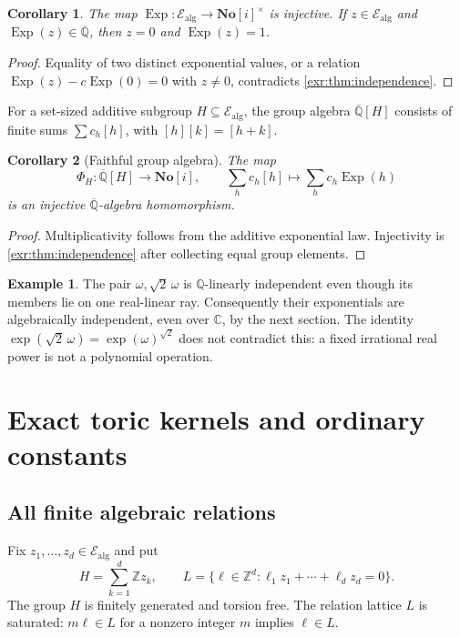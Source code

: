 \documentclass[11pt,letterpaper]{article}
\numberwithin{equation}{section}
\newtheorem{corollary}[corollary]{Corollary}
\theoremstyle{definition}
\newtheorem{example}[example]{Example}
\theoremstyle{remark}
\newcommand{\SC}{\mathbf{No}[i]}
\newcommand{\Z}{\mathbb Z}
\newcommand{\Q}{\mathbb Q}
\newcommand{\C}{\mathbb C}
\newcommand{\Qb}{\overline{\mathbb Q}}
\newcommand{\Ealg}{\mathcal E_{\mathrm{alg}}}
\newcommand{\Exp}{\operatorname{Exp}}
\begin{document}
\begin{corollary}\label{exr:cor:injective}
The map $\Exp:\Ealg\to\SC^\times$ is injective. If $z\in\Ealg$ and
$\Exp(z)\in\Qb$, then $z=0$ and $\Exp(z)=1$.
\end{corollary}
\begin{proof}
Equality of two distinct exponential values, or a relation
$\Exp(z)-c\Exp(0)=0$ with $z\ne0$, contradicts \cref{exr:thm:independence}.
\end{proof}

For a set-sized additive subgroup $H\subseteq\Ealg$, the group algebra $\Qb[H]$
consists of finite sums $\sum c_h[h]$, with $[h][k]=[h+k]$.
\begin{corollary}[Faithful group algebra]\label{exr:cor:groupalgebra}
The map
\begin{equation}
 \Phi_H:\Qb[H]\longrightarrow\SC,\qquad
 \sum_h c_h[h]\longmapsto\sum_h c_h\Exp(h)
\end{equation}
is an injective $\Qb$-algebra homomorphism.
\end{corollary}
\begin{proof}
Multiplicativity follows from the additive exponential law. Injectivity is
\cref{exr:thm:independence} after collecting equal group elements.
\end{proof}

\begin{example}
The pair $\omega,\sqrt2\,\omega$ is $\Q$-linearly independent even though its
members lie on one real-linear ray. Consequently their exponentials are
algebraically independent, even over $\C$, by the next section. The identity
$\exp(\sqrt2\,\omega)=\exp(\omega)^{\sqrt2}$ does not contradict this: a fixed
irrational real power is not a polynomial operation.
\end{example}

\section{Exact toric kernels and ordinary constants}\label{exr:sec:toric}
\subsection{All finite algebraic relations}
Fix $z_1,\ldots,z_d\in\Ealg$ and put
\begin{equation}
 H=\sum_{k=1}^d\Z z_k,\qquad
 L=\{\ell\in\Z^d:\ell_1z_1+\cdots+\ell_dz_d=0\}.
\end{equation}
The group $H$ is finitely generated and torsion free. The relation lattice $L$ is
saturated: $m\ell\in L$ for a nonzero integer $m$ implies $\ell\in L$.
\end{document}
